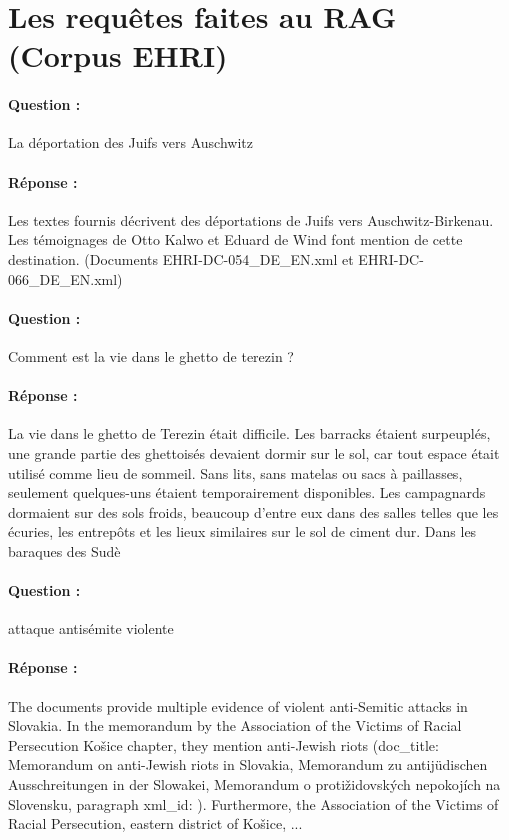 \bigskip 

\section{Les requêtes faites au RAG (Corpus EHRI)} \label{appdx:questions_rag_ehri} 
\bigskip
\paragraph{Question : } La déportation des Juifs vers Auschwitz

\paragraph{Réponse : } Les textes fournis décrivent des déportations de Juifs vers Auschwitz-Birkenau. Les témoignages de Otto Kalwo et Eduard de Wind font mention de cette destination. (Documents EHRI-DC-054\_DE\_EN.xml et EHRI-DC-066\_DE\_EN.xml)

\separation

\paragraph{Question : } Comment est la vie dans le ghetto de terezin ?

\paragraph{Réponse : } La vie dans le ghetto de Terezin était difficile. Les barracks étaient surpeuplés, une grande partie des ghettoisés devaient dormir sur le sol, car tout espace était utilisé comme lieu de sommeil. Sans lits, sans matelas ou sacs à paillasses, seulement quelques-uns étaient temporairement disponibles. Les campagnards dormaient sur des sols froids, beaucoup d'entre eux dans des salles telles que les écuries, les entrepôts et les lieux similaires sur le sol de ciment dur. Dans les baraques des Sudè

\separation

\paragraph{Question : } attaque antisémite violente

\paragraph{Réponse : } The documents provide multiple evidence of violent anti-Semitic attacks in Slovakia. In the memorandum by the Association of the Victims of Racial Persecution Košice chapter, they mention anti-Jewish riots (doc\_title: Memorandum on anti-Jewish riots in Slovakia, Memorandum zu antijüdischen Ausschreitungen in der Slowakei, Memorandum o protižidovských nepokojích na Slovensku, paragraph xml\_id: ). Furthermore, the Association of the Victims of Racial Persecution, eastern district of Košice, ...

